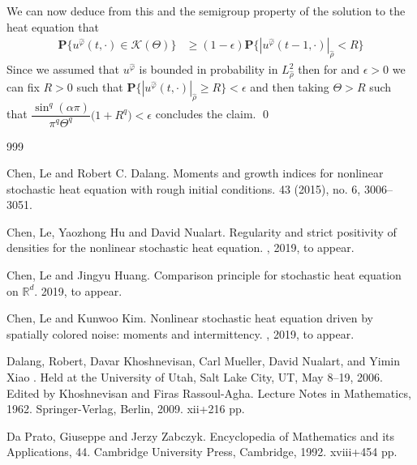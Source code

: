 \documentclass{article}
\numberwithin{equation}{section}
\newcommand{\R}{\mathbb{R}}
\begin{document}
We can now deduce from this and the semigroup property of the solution to the heat equation that 
\begin{align*}
\textbf{P}\{ u^{\hat{\varphi}}(t,\cdot) \in \mathscr K(\Theta) \} & \ge (1- \epsilon)\textbf{P}\{ |u^{\hat{\varphi}}(t-1,\cdot)|_{\hat\rho} < R \}
\end{align*}
Since we assumed that $u^{\hat \varphi}$ is bounded in probability in $L^2_{\hat \rho}$ then for and $\epsilon >0$ we can fix $R>0$ such that $\textbf{P}\{ |u^{\hat{\varphi}}(t,\cdot)|_{\hat\rho} \ge R \} < \epsilon$ and then taking $\Theta > R$ such that $ \dfrac{\sin^q(\alpha \pi)}{\pi^q \Theta^q}\bigg( 1+ R^q \bigg) < \epsilon$ concludes the claim. \qed

\begin{small}
\begin{thebibliography}{999}

Chen, Le and Robert C. Dalang.
\newblock Moments and growth indices for nonlinear stochastic heat equation
with rough initial conditions.
  43 (2015), no. 6, 3006--3051.

Chen, Le, Yaozhong Hu and David Nualart.
\newblock Regularity and strict positivity of densities for the nonlinear stochastic heat equation.
, 2019, to appear.

Chen, Le and Jingyu Huang.
\newblock Comparison principle for stochastic heat equation on $\R^d$.
  2019, to appear.

Chen, Le and Kunwoo Kim.
\newblock Nonlinear stochastic heat equation driven by spatially colored noise: moments and intermittency.
, 2019, to appear.

 Dalang, Robert, Davar Khoshnevisan, Carl 
Mueller, David Nualart, and Yimin Xiao
.
\newblock Held at the University of Utah, Salt Lake City, UT, May 8–19, 2006. 
Edited by  Khoshnevisan and Firas Rassoul-Agha. Lecture Notes in Mathematics, 
1962.  
\newblock Springer-Verlag, Berlin, 2009. xii+216 pp.

Da Prato, Giuseppe and Jerzy Zabczyk.
Encyclopedia of Mathematics and its Applications, 44. Cambridge University Press, Cambridge, 1992. xviii+454 pp.


\end{thebibliography}
\end{small}
\end{document}
